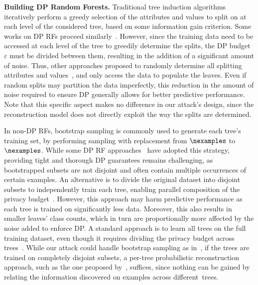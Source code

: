 \textbf{Building DP Random Forests.}
Traditional tree induction algorithms iteratively perform a greedy selection of the attributes and values to split on at each level of the considered tree, based on some information gain criterion. 
Some works on DP RFs proceed similarly~\citep{Singh,DBLP:conf/ausdm/Fletcher015, rana}. 
However, since the training data need to be accessed at each level of the tree to greedily determine the splits, the DP budget $\varepsilon$ must be divided between them, resulting in the addition of a significant amount of noise. 
Thus, other approaches proposed to randomly determine all splitting attributes and values~\citep{jagannathan2012enabling,DBLP:conf/ausai/FletcherI15,fletcher2016smooth}, and only access the data to populate the leaves. 
Even if random splits may partition the data imperfectly, this reduction in the amount of noise required to ensure DP generally allows for better predictive performance. 
Note that this specific aspect makes no difference in our attack's design, since the reconstruction model does not directly exploit the way the splits are determined.

In non-DP RFs, bootstrap sampling is commonly used to generate each tree's training set, by performing sampling with replacement from $\nexamples$ to $\nexamples$. 
While some DP RF approaches~\citep{rana} have adopted this strategy, providing tight and thorough DP guarantees remains challenging, as bootstrapped subsets are not disjoint and often contain multiple occurrences of certain examples. An alternative is to divide the original dataset into disjoint subsets to independently train each tree, enabling parallel composition of the privacy budget~\citep{DBLP:conf/ausai/FletcherI15,fletcher2016smooth}. However, this approach may harm predictive performance as each tree is trained on significantly less data. Moreover, this also results in smaller leaves' class counts, which in turn are proportionally more affected by the noise added to enforce DP. 
A standard approach is to learn all trees on the full training dataset, even though it requires dividing the privacy budget across trees~\citep{jagannathan2012enabling,DBLP:conf/ausai/FletcherI15,fletcher2016smooth,Singh,DBLP:conf/ausdm/Fletcher015}. 
While our attack could handle bootstrap sampling as in~\citet{ferry2024trained}, if the trees are trained on completely disjoint subsets, a per-tree probabilistic reconstruction approach, such as the one proposed by~\citet{ferry2024probabilistic}, suffices, since nothing can be gained by relating the information discovered on examples across different~trees.

